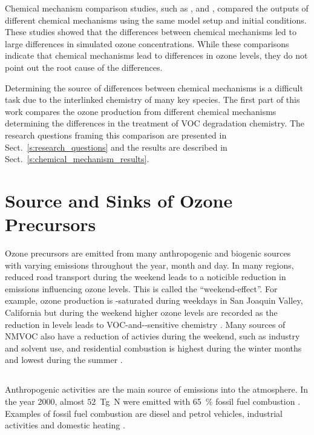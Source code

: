 Chemical mechanism comparison studies, such as \citet{Kuhn:1998}, \citet{Emmerson:2009} and \citet{Archibald:2010}, compared the outputs of different chemical mechanisms using the same model setup and initial conditions.
These studies showed that the differences between chemical mechanisms led to large differences in simulated ozone concentrations.
While these comparisons indicate that chemical mechanisms lead to differences in ozone levels, they do not point out the root cause of the differences.

Determining the source of differences between chemical mechanisms is a difficult task due to the interlinked chemistry of many key species.
The first part of this work compares the ozone production from different chemical mechanisms determining the differences in the treatment of VOC degradation chemistry.
The research questions framing this comparison are presented in Sect.~\ref{s:research_questions} and the results are described in Sect.~\ref{s:chemical_mechanism_results}.

\newpage
\section{Source and Sinks of Ozone Precursors} \label{s:precursor_emissions}
Ozone precursors are emitted from many anthropogenic and biogenic sources with varying emissions throughout the year, month and day.
In many regions, reduced road transport during the weekend leads to a noticible reduction in  emissions influencing ozone levels.
This is called the ``weekend-effect''.
For example, ozone production is -saturated during weekdays in San Joaquin Valley, California but during the weekend higher ozone levels are recorded as the reduction in  levels leads to VOC-and--sensitive chemistry \citep{Pusede:2014}.
Many sources of NMVOC also have a reduction of activies during the weekend, such as industry and solvent use, and residential combustion is highest during the winter months and lowest during the summer \citep{Gon:2011}.

\subsection[NOx]{}
Anthropogenic activities are the main source of  emissions into the atmosphere.
In the year 2000, almost $52$~Tg~N were emitted with 65~\% fossil fuel combustion \citep{Seinfeld:2006}. 
Examples of fossil fuel combustion are diesel and petrol vehicles, industrial activities and domestic heating \citep{vonSchneidemesser:2015}.

